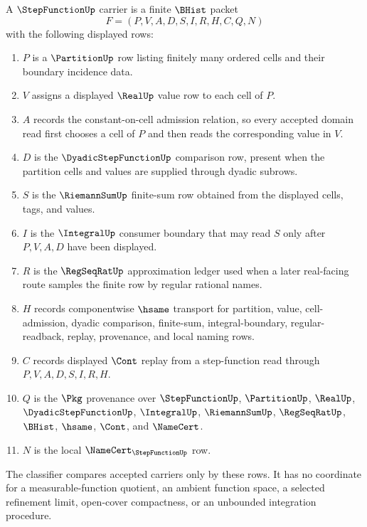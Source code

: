\begin{definition}
\label{def:step-function-carrier}
A $\StepFunctionUp$ carrier is a finite $\BHist$ packet
$$
F=(P,V,A,D,S,I,R,H,C,Q,N)
$$
with the following displayed rows:
\begin{enumerate}
\item $P$ is a $\PartitionUp$ row listing finitely many ordered cells and their boundary incidence data.
\item $V$ assigns a displayed $\RealUp$ value row to each cell of $P$.
\item $A$ records the constant-on-cell admission relation, so every accepted domain read first chooses a cell of $P$ and then reads the corresponding value in $V$.
\item $D$ is the $\DyadicStepFunctionUp$ comparison row, present when the partition cells and values are supplied through dyadic subrows.
\item $S$ is the $\RiemannSumUp$ finite-sum row obtained from the displayed cells, tags, and values.
\item $I$ is the $\IntegralUp$ consumer boundary that may read $S$ only after $P,V,A,D$ have been displayed.
\item $R$ is the $\RegSeqRatUp$ approximation ledger used when a later real-facing route samples the finite row by regular rational names.
\item $H$ records componentwise $\hsame$ transport for partition, value, cell-admission, dyadic comparison, finite-sum, integral-boundary, regular-readback, replay, provenance, and local naming rows.
\item $C$ records displayed $\Cont$ replay from a step-function read through $P,V,A,D,S,I,R,H$.
\item $Q$ is the $\Pkg$ provenance over $\StepFunctionUp$, $\PartitionUp$, $\RealUp$, $\DyadicStepFunctionUp$, $\IntegralUp$, $\RiemannSumUp$, $\RegSeqRatUp$, $\BHist$, $\hsame$, $\Cont$, and $\NameCert$.
\item $N$ is the local $\NameCert_{\StepFunctionUp}$ row.
\end{enumerate}
The classifier compares accepted carriers only by these rows. It has no coordinate for a measurable-function quotient, an ambient function space, a selected refinement limit, open-cover compactness, or an unbounded integration procedure.
\end{definition}

